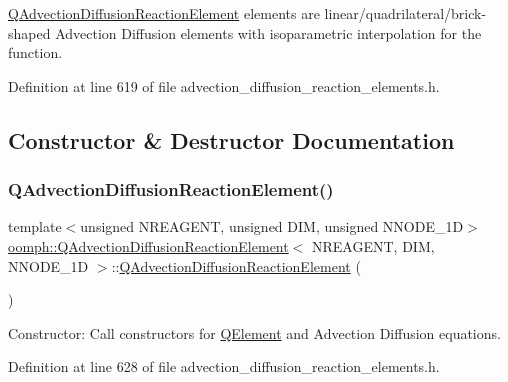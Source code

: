 \hyperlink{classoomph_1_1QAdvectionDiffusionReactionElement}{Q\+Advection\+Diffusion\+Reaction\+Element} elements are linear/quadrilateral/brick-\/shaped Advection Diffusion elements with isoparametric interpolation for the function. 

Definition at line 619 of file advection\+\_\+diffusion\+\_\+reaction\+\_\+elements.\+h.



\subsection{Constructor \& Destructor Documentation}
\mbox{\label{classoomph_1_1QAdvectionDiffusionReactionElement_add22bb19f8f4a185e0e7820c7f43121f}} 
\subsubsection{\texorpdfstring{Q\+Advection\+Diffusion\+Reaction\+Element()}{QAdvectionDiffusionReactionElement()}\hspace{0.1cm}{\footnotesize\ttfamily [1/2]}}
{\footnotesize\ttfamily template$<$unsigned N\+R\+E\+A\+G\+E\+NT, unsigned D\+IM, unsigned N\+N\+O\+D\+E\+\_\+1D$>$ \\
\hyperlink{classoomph_1_1QAdvectionDiffusionReactionElement}{oomph\+::\+Q\+Advection\+Diffusion\+Reaction\+Element}$<$ N\+R\+E\+A\+G\+E\+NT, D\+IM, N\+N\+O\+D\+E\+\_\+1D $>$\+::\hyperlink{classoomph_1_1QAdvectionDiffusionReactionElement}{Q\+Advection\+Diffusion\+Reaction\+Element} (\begin{DoxyParamCaption}{ }\end{DoxyParamCaption})\hspace{0.3cm}{\ttfamily [inline]}}



Constructor\+: Call constructors for \hyperlink{classoomph_1_1QElement}{Q\+Element} and Advection Diffusion equations. 



Definition at line 628 of file advection\+\_\+diffusion\+\_\+reaction\+\_\+elements.\+h.

